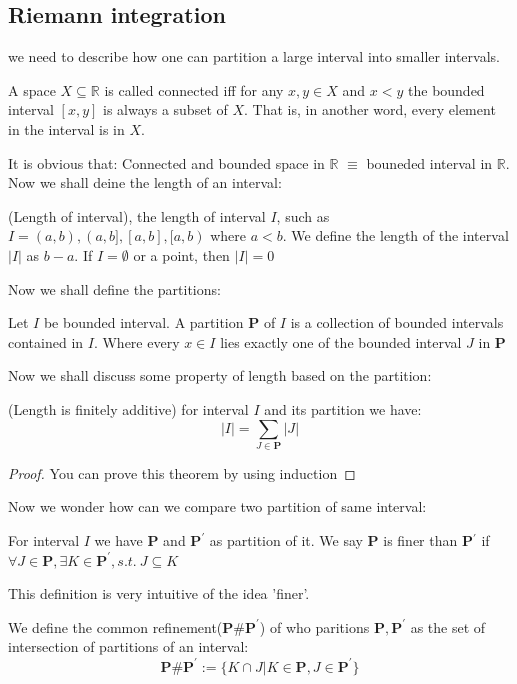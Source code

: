 \documentclass{article}
\newcommand{\R}{\mathbb{R}}
\begin{document}
\subsection{Riemann integration}
we need to describe how one can partition a large interval into smaller intervals.
\begin{definition}
	A space $X\subseteq \R$ is called connected iff for any $x,y\in X$ and $x<y$ the bounded interval $[x,y]$ is always a subset of $X$. That is, in another word, every element in the interval is in $X$.
\end{definition}
It is obvious that: Connected and bounded space in $\R$ $\equiv$ bouneded interval in $\R$. 
Now we shall deine the length of an interval:
\begin{definition}
	(Length of interval), the length of interval $I$, such as $I=(a,b),(a,b],[a,b],[a,b)$ where $a<b$. We define the length of the interval $|I|$ as $b-a$. If $I=\emptyset$ or a point, then $|I|=0$
\end{definition}

Now we shall define the partitions:
\begin{definition}
	Let $I$ be bounded interval. A partition \textbf{P} of $I$ is a collection of bounded intervals contained in $I$. Where every $x\in I$ lies exactly one of the bounded interval $J$ in \textbf{P}  
\end{definition}

Now we shall discuss some property of length based on the partition:
\begin{theorem}
	(Length is finitely additive) for interval $I$ and its partition we have:
	\begin{equation*}
		|I| = \sum_{J\in \textbf{P}} |J|
	\end{equation*}
\end{theorem}

\begin{proof}
	You can prove this theorem by using induction
\end{proof}

Now we wonder how can we compare two partition of same interval:
\begin{definition}
	For interval $I$ we have \textbf{P} and $\textbf{P}^{'}$ as partition of it. We say \textbf{P} is finer than \textbf{P}$^{'}$ if $\forall J\in \textbf{P}, \exists K\in \textbf{P}^{'},s.t. \ J\subseteq K$
\end{definition}

This definition is very intuitive of the idea 'finer'. 
\begin{definition}
	We define the common refinement($\textbf{P}\#\textbf{P}^{'}$) of who paritions $\textbf{P},\textbf{P}^{'}$ as the set of intersection of partitions of an interval:
	\begin{equation*}
		\textbf{P}\#\textbf{P}^{'}:=\{K\cap J|K\in \textbf{P},J\in \textbf{P}^{'}\}
	\end{equation*}
\end{definition}
\end{document}
